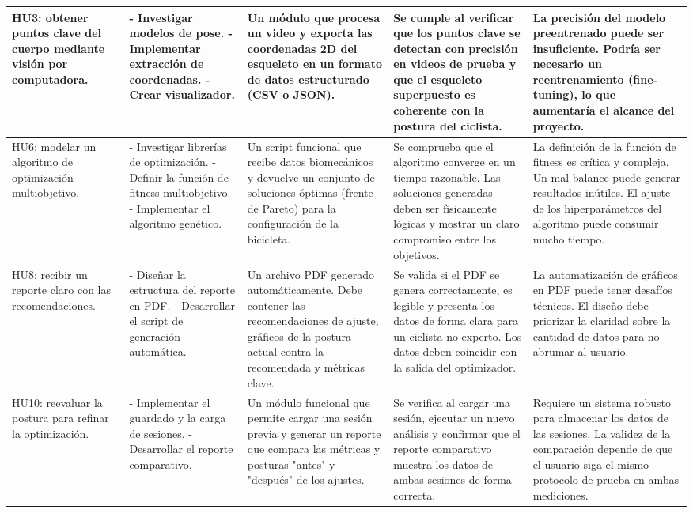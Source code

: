 \documentclass[
11pt, %
]{charter}
\begin{document}
\begin{xltabular}{\linewidth}{| X | X | X | X | X |}
HU3: obtener puntos clave del cuerpo mediante visión por computadora.
 & - Investigar modelos de pose. \newline - Implementar extracción de coordenadas. \newline - Crear visualizador.
 & Un módulo que procesa un video y exporta las coordenadas 2D del esqueleto en un formato de datos estructurado (CSV o JSON).
 & Se cumple al verificar que los puntos clave se detectan con precisión en videos de prueba y que el esqueleto superpuesto es coherente con la postura del ciclista.
 & La precisión del modelo preentrenado puede ser insuficiente. Podría ser necesario un reentrenamiento (fine-tuning), lo que aumentaría el alcance del proyecto. \\
\hline
HU6: modelar un algoritmo de optimización multiobjetivo.
 & - Investigar librerías de optimización. \newline - Definir la función de fitness multiobjetivo. \newline - Implementar el algoritmo genético.
 & Un script funcional que recibe datos biomecánicos y devuelve un conjunto de soluciones óptimas (frente de Pareto) para la configuración de la bicicleta.
 & Se comprueba que el algoritmo converge en un tiempo razonable. Las soluciones generadas deben ser físicamente lógicas y mostrar un claro compromiso entre los objetivos.
 & La definición de la función de fitness es crítica y compleja. Un mal balance puede generar resultados inútiles. El ajuste de los hiperparámetros del algoritmo puede consumir mucho tiempo. \\
\hline
HU8: recibir un reporte claro con las recomendaciones.
 & - Diseñar la estructura del reporte en PDF. \newline - Desarrollar el script de generación automática.
 & Un archivo PDF generado automáticamente. Debe contener las recomendaciones de ajuste, gráficos de la postura actual contra la recomendada y métricas clave.
 & Se valida si el PDF se genera correctamente, es legible y presenta los datos de forma clara para un ciclista no experto. Los datos deben coincidir con la salida del optimizador.
 & La automatización de gráficos en PDF puede tener desafíos técnicos. El diseño debe priorizar la claridad sobre la cantidad de datos para no abrumar al usuario. \\
\hline
HU10: reevaluar la postura para refinar la optimización.
 & - Implementar el guardado y la carga de sesiones. \newline - Desarrollar el reporte comparativo.
 & Un módulo funcional que permite cargar una sesión previa y generar un reporte que compara las métricas y posturas "antes" y "después" de los ajustes.
 & Se verifica al cargar una sesión, ejecutar un nuevo análisis y confirmar que el reporte comparativo muestra los datos de ambas sesiones de forma correcta.
 & Requiere un sistema robusto para almacenar los datos de las sesiones. La validez de la comparación depende de que el usuario siga el mismo protocolo de prueba en ambas mediciones. \\

\end{xltabular}
\end{document}
